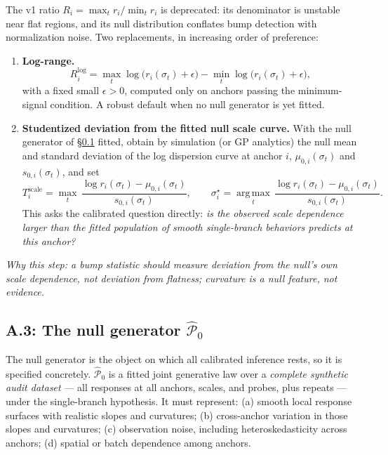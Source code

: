 \documentclass[11pt]{article}
\newcommand{\argmax}{\operatorname*{arg\,max}}
\newcommand{\nullgen}{\widehat{\mathcal P}_0}
\newcommand{\why}[1]{\par\noindent\textcolor{muted}{\small\itshape Why this step: #1}}
\begin{document}
The v1 ratio \(R_i=\max_t r_i/\min_t r_i\) is deprecated: its denominator is unstable near
flat regions, and its null distribution conflates bump detection with normalization noise.
Two replacements, in increasing order of preference:
\begin{enumerate}[label=\textbf{S\arabic*.},leftmargin=2.6em]
  \item \textbf{Log-range.}
  \[
    R_i^{\log}
    =\max_t \log\bigl(r_i(\sigma_t)+\epsilon\bigr)
    -\min_t \log\bigl(r_i(\sigma_t)+\epsilon\bigr),
  \]
  with a fixed small \(\epsilon>0\), computed only on anchors passing the minimum-signal
  condition. A robust default when no null generator is yet fitted.
  \item \textbf{Studentized deviation from the fitted null scale curve.} With the null
  generator of \S\ref{sec:generator} fitted, obtain by simulation (or GP analytics) the null
  mean and standard deviation of the log dispersion curve at anchor \(i\),
  \(\mu_{0,i}(\sigma_t)\) and \(s_{0,i}(\sigma_t)\), and set
  \[
    T_i^{\mathrm{scale}}
    =\max_t\,
    \frac{\log r_i(\sigma_t)-\mu_{0,i}(\sigma_t)}{s_{0,i}(\sigma_t)},
    \qquad
    \sigma_i^\star=\argmax_t\,
    \frac{\log r_i(\sigma_t)-\mu_{0,i}(\sigma_t)}{s_{0,i}(\sigma_t)} .
  \]
  This asks the calibrated question directly: \emph{is the observed scale dependence larger
  than the fitted population of smooth single-branch behaviors predicts at this anchor?}
\end{enumerate}
\why{a bump statistic should measure deviation from the null's own scale dependence,
not deviation from flatness; curvature is a null feature, not evidence.}

\subsection{A.3: The null generator \texorpdfstring{$\nullgen$}{P0}}
\label{sec:generator}

The null generator is the object on which all calibrated inference rests, so it is specified
concretely. \(\nullgen\) is a fitted joint generative law over a \emph{complete synthetic
audit dataset} --- all responses at all anchors, scales, and probes, plus repeats --- under
the single-branch hypothesis. It must represent: (a) smooth local response surfaces with
realistic slopes and curvatures; (b) cross-anchor variation in those slopes and curvatures;
(c) observation noise, including heteroskedasticity across anchors; (d) spatial or batch
dependence among anchors.
\end{document}
